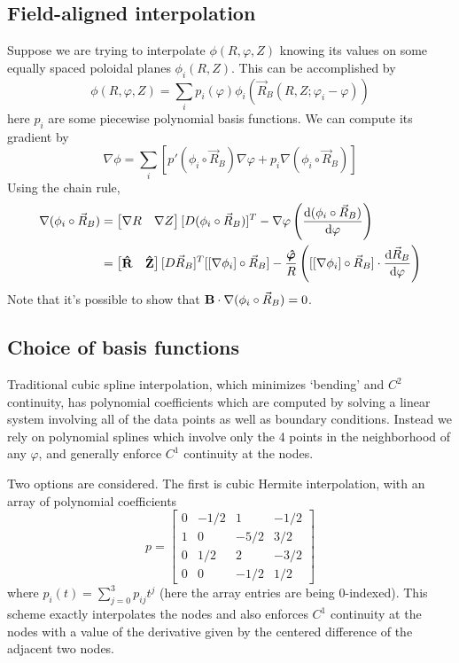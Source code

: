 \documentclass[]{article}
\begin{document}
\subsection{Field-aligned interpolation}
Suppose we are trying to interpolate \(\phi(R,\varphi,Z)\) knowing its values on some equally spaced poloidal planes \(\phi_i(R,Z)\).
This can be accomplished by
\begin{equation*}
	\phi(R,\varphi,Z) = \sum_{i} p_i(\varphi) \phi_i(\vec{R}_B(R,Z;\varphi_i-\varphi))
\end{equation*}
here \(p_i\) are some piecewise polynomial basis functions.
We can compute its gradient by
\begin{equation*}
	\nabla \phi = \sum_{i} \left[p' (\phi_i \circ \vec{R}_B) \nabla \varphi + p_i \nabla (\phi_i \circ \vec{R}_B)\right]
\end{equation*}
Using the chain rule,
\begin{align*}
	\nabla (\phi_i \circ \vec{R}_B) &=
	\begin{bmatrix}
		\nabla R & \nabla Z
	\end{bmatrix}
	[D(\phi_i \circ \vec{R}_B)]^T
	-
	\nabla \varphi \left(\dv{(\phi_i \circ \vec{R}_B)}{\varphi}\right) \\
	&=
	\begin{bmatrix}
		\vu{R} & \vu{Z}
	\end{bmatrix}
	[D \vec{R}_B]^T
	[[\nabla \phi_i] \circ \vec{R}_B]
	-
	\frac{\vu*{\varphi}}{R}\left([[\nabla \phi_i]\circ \vec{R}_B] \cdot \dv{\vec{R}_B}{\varphi}\right)
\end{align*}
Note that it's possible to show that \(\vb{B} \cdot \nabla (\phi_i \circ \vec{R}_B) = 0\).

\subsection{Choice of basis functions}

Traditional cubic spline interpolation, which minimizes `bending' and \(C^2\) continuity, has polynomial coefficients which are computed by solving a linear system involving all of the data points as well as boundary conditions.
Instead we rely on polynomial splines which involve only the 4 points in the neighborhood of any \(\varphi\), and generally enforce \(C^1\) continuity at the nodes.

Two options are considered.
The first is cubic Hermite interpolation, with an array of polynomial coefficients
\begin{equation*}
	p = \begin{bmatrix}
		0 & -1/2 & 1 & -1/2 \\
		1 & 0 & -5/2 & 3/2 \\
		0 & 1/2 & 2 & -3/2 \\
		0 & 0 & -1/2 & 1/2
	\end{bmatrix}
\end{equation*}
where \(p_i(t) = \sum_{j=0}^{3} p_{ij} t^j\) (here the array entries are being 0-indexed).
This scheme exactly interpolates the nodes and also enforces \(C^1\) continuity at the nodes with a value of the derivative given by the centered difference of the adjacent two nodes.
\end{document}
